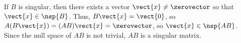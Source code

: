 If $B$ is singular, then there exists a vector $\vect{x}\ne\zerovector$ so that $\vect{x}\in \nsp{B}$.  Thus, $B\vect{x} = \vect{0}$, so $A(B\vect{x}) = (AB)\vect{x} = \zerovector$, so $\vect{x}\in\nsp{AB}$.  Since the null space of $AB$ is not trivial, $AB$ is a singular matrix.
